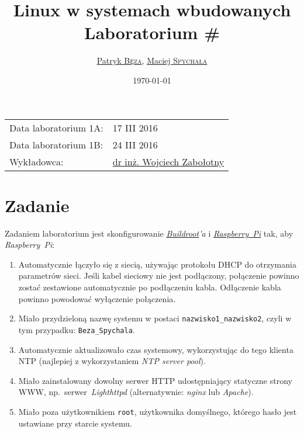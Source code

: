 \documentclass{article}
\title{Linux w systemach wbudowanych\\Laboratorium \#\labnumber}
\author{\href{mailto:bezap@student.mini.pw.edu.pl}{Patryk \textsc{Bęza}}, \href{mailto:spychalam@student.mini.pw.edu.pl}{Maciej \textsc{Spychała}}}
\date{\today}
\newcommand{\labnumber}{1}
\begin{document}
\maketitle

\begin{center}
\begin{tabular}{ll}
Data laboratorium \labnumber A: & 17 III 2016\\
Data laboratorium \labnumber B: & 24 III 2016\\
Wykładowca: & \href{mailto:wzab@ise.pw.edu.pl}{dr inż. Wojciech Zabołotny}
\end{tabular}
\end{center}



\section{Zadanie}
\label{task}

Zadaniem laboratorium jest skonfigurowanie \emph{\href{https://buildroot.org/}{Buildroot}'a} i \emph{\href{https://www.raspberrypi.org/}{Raspberry~Pi}} tak, aby \emph{Raspberry~Pi}:

\begin{enumerate}
\item Automatycznie łączyło się z siecią, używając protokołu DHCP do otrzymania parametrów sieci. Jeśli kabel sieciowy nie jest podłączony, połączenie powinno zostać zestawione automatycznie po podłączeniu kabla. Odłączenie kabla powinno powodować wyłączenie połączenia.
\item Miało przydzieloną nazwę systemu w postaci \texttt{nazwisko1\_nazwisko2}, czyli w tym przypadku: \texttt{Beza\_Spychala}.
\item Automatycznie aktualizowało czas systemowy, wykorzystując do tego klienta NTP (najlepiej z wykorzystaniem \emph{NTP server pool}).
\item Miało zainstalowany dowolny serwer HTTP udostępniający statyczne strony WWW, np.~serwer~\emph{Lighthttpd} (alternatywnie: \emph{nginx} lub \emph{Apache}).
\item Miało poza użytkownikiem \texttt{root}, użytkownika domyślnego, którego hasło jest ustawiane przy starcie systemu.
\end{enumerate}
\end{document}
